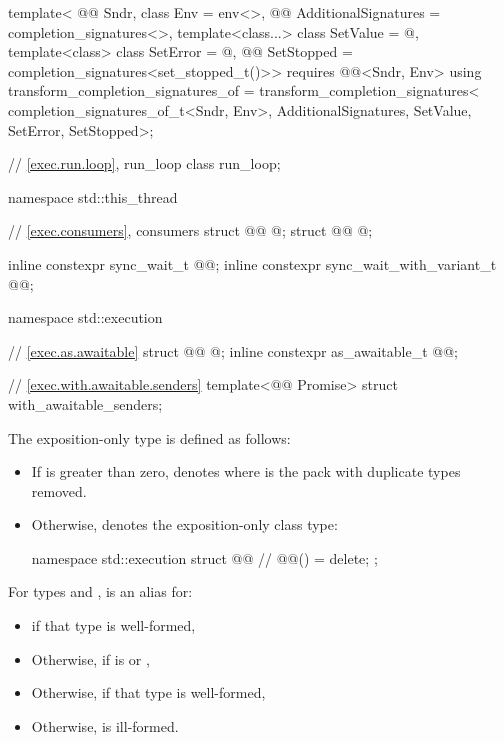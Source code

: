 \begin{codeblock}
{  template<
    @@ Sndr,
    class Env = env<>,
    @@ AdditionalSignatures = completion_signatures<>,
    template<class...> class SetValue = @\seebelow@,
    template<class> class SetError = @\seebelow@,
    @@ SetStopped = completion_signatures<set_stopped_t()>>
      requires @@<Sndr, Env>
  using transform_completion_signatures_of =
    transform_completion_signatures<
      completion_signatures_of_t<Sndr, Env>,
      AdditionalSignatures, SetValue, SetError, SetStopped>;

  // \ref{exec.run.loop}, run_loop
  class run_loop;
}

namespace std::this_thread {
  // \ref{exec.consumers}, consumers
  struct @@ { @\unspec@ };
  struct @@ { @\unspec@ };

  inline constexpr sync_wait_t @@{};
  inline constexpr sync_wait_with_variant_t @@{};
}

namespace std::execution {
  // \ref{exec.as.awaitable}
  struct @@ { @\unspec@ };
  inline constexpr as_awaitable_t @@{};

  // \ref{exec.with.awaitable.senders}
  template<@@ Promise>
    struct with_awaitable_senders;
}
\end{codeblock}

\pnum
The exposition-only type 
is defined as follows:
\begin{itemize}
\item
If  is greater than zero,
 denotes 
where  is the pack 
with duplicate types removed.
\item
Otherwise,  denotes
the exposition-only class type:
\begin{codeblock}
namespace std::execution {
  struct @@ {        // \expos
    @@() = delete;
  };
}
\end{codeblock}
\end{itemize}

\pnum
For types  and ,
 is an alias for:
\begin{itemize}
\item
{}
if that type is well-formed,
\item
Otherwise, 
if  is
 or ,
\item
Otherwise, 
if that type is well-formed,
\item
Otherwise,  is ill-formed.
\end{itemize}

